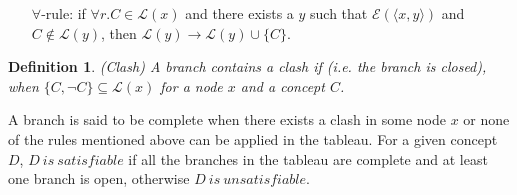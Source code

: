 \documentclass{article}
\newtheorem{mydef}{Definition}
\begin{document}
\begin{itemize}
\item[$\forall$-rule:] if $\forall r.C\in \mathcal{L}(x)$ and there exists a $y$ such that $\mathcal{E}(\langle x,y \rangle)$ and $C\notin \mathcal{L}(y)$,
then $ \mathcal{L}(y)\rightarrow  \mathcal{L}(y)\cup \{C\}$.
\begin{center}
\end{center}
\end{itemize}

\begin{mydef}(Clash)
A branch contains a clash if (i.e. the branch is closed), when $\{C,\neg C\}\subseteq \mathcal{L}(x)$ for a node $x$ and a concept $C$.
\end{mydef}
\begin{center}
\end{center}

A branch is said to be complete  when there exists a clash in some node $x$ or none of the rules mentioned above can be applied in the tableau. 
For a given concept $D$, $D ~ is ~ satisfiable$ if all the branches in the tableau are complete and at least one branch is open,
otherwise   $D ~ is ~ unsatisfiable$.
\end{document}
